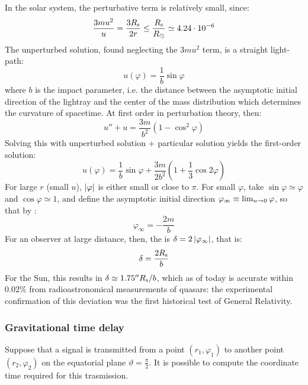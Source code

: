 In the solar system, the perturbative term is relatively small, since:
\begin{equation*}
  \frac{3mu^2}{u} = \frac{3R_\text{s}}{2r} \leq \frac{R_\text{s}}{R_\odot} \simeq 4.24 \cdot 10^{-6}
\end{equation*}
The unperturbed solution, found neglecting the $ 3mu^2 $ term, is a straight light-path:
\begin{equation}
  u(\varphi) = \frac{1}{b} \sin \varphi
\end{equation}
where $ b $ is the impact parameter, i.e. the distance between the asymptotic initial direction of the lightray and the center of the mass distribution which determines the curvature of spacetime.
At first order in perturbation theory, then:
\begin{equation*}
  u'' + u = \frac{3m}{b^2} \left( 1 - \cos^2 \varphi \right)
\end{equation*}
Solving this with unperturbed solution $ + $ particular solution yields the first-order solution:
\begin{equation}
  u(\varphi) = \frac{1}{b} \sin \varphi + \frac{3m}{2b^2} \left( 1 + \frac{1}{3} \cos 2\varphi \right)
  \label{eq:schwarz-light}
\end{equation}
For large $ r $ (small $ u $), $ \left\lvert\varphi\right\rvert $ is either small or close to $ \pi $. For small $ \varphi $, take $ \sin \varphi \simeq \varphi $ and $ \cos \varphi \simeq 1 $, and define the asymptotic initial direction $ \varphi_\infty \equiv \lim_{u \rightarrow 0} \varphi $, so that by :
\begin{equation}
  \varphi_\infty = - \frac{2m}{b}
\end{equation}
For an observer at large distance, then, the  is $ \delta = 2 \left\lvert\varphi_\infty\right\rvert $, that is:
\begin{equation}
  \delta = \frac{2R_\text{s}}{b}
  \label{eq:light-deflection}
\end{equation}
For the Sun, this results in $ \delta \simeq 1.75'' R_\text{s} / b $, which as of today is accurate within $ 0.02\% $ from radioastronomical measurements of quasars: the experimental confirmation of this deviation was the first historical test of General Relativity.

\subsubsection{Gravitational time delay}

Suppose that a signal is transmitted from a point $ (r_1 , \varphi_1) $ to another point $ (r_2 , \varphi_2) $ on the equatorial plane $ \vartheta = \frac{\pi}{2} $. It is possible to compute the coordinate time required for this trasmission.

